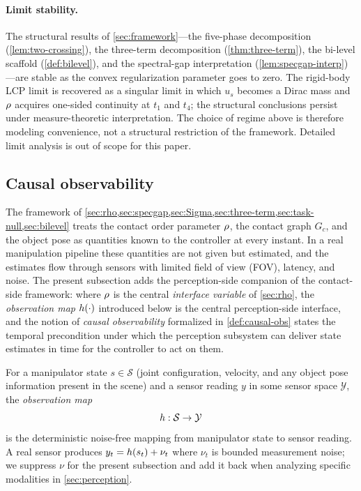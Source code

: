 \paragraph{Limit stability.}
The structural results of \cref{sec:framework}---the five-phase decomposition
(\cref{lem:two-crossing}), the three-term decomposition
(\cref{thm:three-term}), the bi-level scaffold
(\cref{def:bilevel}), and the spectral-gap interpretation
(\cref{lem:specgap-interp})---are stable as the convex
regularization parameter goes to zero. The rigid-body LCP limit
is recovered as a singular limit in which $u_{s}$ becomes a Dirac
mass and $\rho$ acquires one-sided continuity at $t_{1}$
and $t_{4}$; the structural conclusions persist under
measure-theoretic interpretation. The choice of regime above is
therefore modeling convenience, not a structural restriction of
the framework. Detailed limit analysis is out of scope for this
paper.

\subsection{Causal observability}
\label{sec:causal-obs}

The framework of \cref{sec:rho,sec:specgap,sec:Sigma,sec:three-term,sec:task-null,sec:bilevel}
treats the contact order parameter $\rho$, the contact graph
$G_{c}$, and the object pose as quantities known to the controller
at every instant. In a real manipulation pipeline these
quantities are not given but estimated, and the estimates flow
through sensors with limited field of view (FOV), latency, and
noise. The present subsection adds the perception-side companion
of the contact-side framework: where $\rho$ is the central
\emph{interface variable} of \cref{sec:rho}, the
\emph{observation map} $h(\cdot)$ introduced below is the
central perception-side interface, and the notion of
\emph{causal observability} formalized in
\cref{def:causal-obs} states the temporal precondition under
which the perception subsystem can deliver state estimates in
time for the controller to act on them.

\begin{definition}\label{def:obsmap}
For a manipulator state $s \in \mathcal{S}$ (joint configuration,
velocity, and any object pose information present in the scene)
and a sensor reading $y$ in some sensor space $\mathcal{Y}$, the
\emph{observation map}
\[
  h : \mathcal{S} \to \mathcal{Y}
\]
is the deterministic noise-free mapping from manipulator state to
sensor reading. A real sensor produces $y_{t} = h(s_{t}) +
\nu_{t}$ where $\nu_{t}$ is bounded measurement noise; we suppress
$\nu$ for the present subsection and add it back when analyzing
specific modalities in \cref{sec:perception}.
\end{definition}

